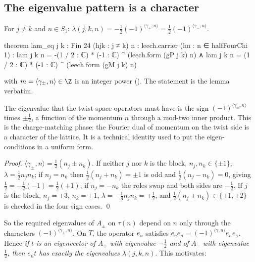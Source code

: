 \subsection{The eigenvalue pattern is a character}
\begin{lemma}\label{ch13:lem:lam-eq}
For $j\ne k$ and $n\in S_1$:
$\lambda(j,k,n)=-\tfrac12(-1)^{\langle\gamma_+,n\rangle}=\tfrac12(-1)^{\langle\gamma_-,n\rangle}$.
\end{lemma}
\begin{leancode}
theorem lam_eq {j k : Fin 24} (hjk : j ≠ k) {n : leech.carrier} (hn : n ∈ halfFourChi 1) :
    lam j k n = -(1 / 2 : ℂ) * (-1 : ℂ) ^ (leech.form (gP j k) n) ∧
      lam j k n = (1 / 2 : ℂ) * (-1 : ℂ) ^ (leech.form (gM j k) n)
\end{leancode}
\begin{dictionary}
 with $m=\langle\gamma_\pm,n\rangle\in\Z$ is an integer power (). The statement
is the lemma verbatim.
\end{dictionary}
\begin{physics}
The eigenvalue that the twist-space operators must have is the sign $(-1)^{\langle\gamma_\pm,n\rangle}$ times $\pm\tfrac12$, a function of the momentum $n$ through a mod-two inner product. This is the charge-matching phase: the Fourier dual of momentum on the twist side is a character of the lattice. It is a technical identity used to put the eigen-conditions in a uniform form.
\end{physics}
\noindent\emph{Proof.} $\langle\gamma_\pm,n\rangle=\tfrac12(n_j\pm n_k)$. If neither $j$ nor $k$ is the block,
$n_j,n_k\in\{\pm1\}$, $\lambda=\tfrac12n_jn_k$; if $n_j=n_k$ then $\tfrac12(n_j+n_k)=\pm1$ is odd and $\tfrac12(n_j-n_k)=0$,
giving $\tfrac12=-\tfrac12(-1)=\tfrac12(+1)$; if $n_j=-n_k$ the roles swap and both sides are $-\tfrac12$. If $j$ is the
block, $n_j=\pm3$, $n_k=\pm1$, $\lambda=-\tfrac16n_jn_k=\mp\tfrac12$, and $\tfrac12(n_j\pm n_k)\in\{\pm1,\pm2\}$ is checked in
the four sign cases. \qed

So the required eigenvalues of $A_\pm$ on $\tau(n)$ depend on $n$ only through the characters
$(-1)^{\langle\gamma_\pm,n\rangle}$. On $T$, the operator $e_n$ satisfies $e_{\gamma}e_n=(-1)^{\langle\gamma,n\rangle}e_ne_\gamma$. Hence
\emph{if $t$ is an eigenvector of $A_+$ with eigenvalue $-\tfrac12$ and of $A_-$ with eigenvalue $\tfrac12$, then
$e_nt$ has exactly the eigenvalues $\lambda(j,k,n)$}. This motivates:

